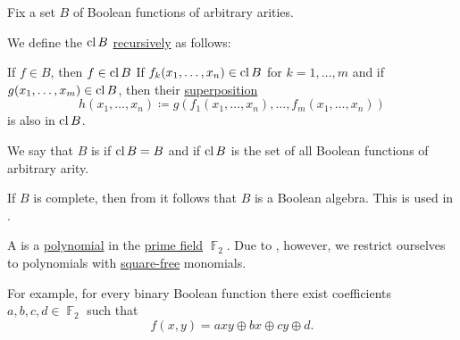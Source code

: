 \begin{definition}\label{def:boolean_closure}
  Fix a set \( B \) of Boolean functions of arbitrary arities.

  We define the  \( \operatorname{cl}{B} \) \hyperref[rem:structural_recursion_and_induction]{recursively} as follows:
  \begin{thmenum}
     If \( f \in B \), then \( f \in \operatorname{cl}{B} \)
     If \( f_k(x_1, \ldots, x_n) \in \operatorname{cl}{B} \) for \( k = 1, \ldots, m \) and if \( g(x_1, \ldots, x_m) \in \operatorname{cl}{B} \), then their \hyperref[def:multi_valued_function/superposition]{superposition}
    \begin{equation*}
      h(x_1, \ldots, x_n) \coloneqq g(f_1(x_1, \ldots, x_n), \ldots, f_m(x_1, \ldots, x_n))
    \end{equation*}
    is also in \( \operatorname{cl}{B} \).
  \end{thmenum}

  We say that \( B \) is  if \( \operatorname{cl}{B} = B \) and  if \( \operatorname{cl}{B} \) is the set of all Boolean functions of arbitrary arity.
\end{definition}
\begin{comments}
  \item If \( B \) is complete, then from  it follows that \( B \) is a Boolean algebra. This is used in .
\end{comments}

\begin{definition}\label{def:zhegalkin_polynomial}
  A  is a \hyperref[def:polynomial_algebra]{polynomial} in the \hyperref[thm:finite_fields]{prime field} \( \BbbF_2 \). Due to , however, we restrict ourselves to polynomials with \hyperref[def:square_free]{square-free} monomials.

  For example, for every binary Boolean function there exist coefficients \( a, b, c, d \in \BbbF_2 \) such that
  \begin{equation}\label{eq:def:zhegalkin_polynomial/binary_polynomial}
    f(x, y) = axy \oplus bx \oplus cy \oplus d.
  \end{equation}
\end{definition}

